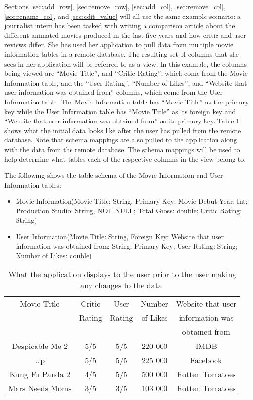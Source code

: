 \documentclass[12pt]{article}
\begin{document}
Sections \ref{sec:add_row}, \ref{sec:remove_row},  \ref{sec:add_col}, \ref{sec:remove_col}, \ref{sec:rename_col}, and \ref{sec:edit_value} will all use the same example scenario: a journalist intern has been tasked with writing a comparison article about the different animated movies produced in the last five years and how critic and user reviews differ. She has used her application to pull data from multiple movie information tables in a remote database. The resulting set of columns that she sees in her application will be referred to as a view. In this example, the columns being viewed are ``Movie Title'', and ``Critic Rating'', which come from the Movie Information table, and the ``User Rating'', ``Number of Likes'', and ``Website that user information was obtained from'' columns, which come from the User Information table. The Movie Information table has ``Movie Title'' as the primary key while the User Information table has ``Movie Title'' as its foreign key and ``Website that user information was obtained from'' as its primary key. Table \ref{table:add_row_table_example} shows what the initial data looks like after the user has pulled from the remote database. Note that schema mappings are also pulled to the application along with the data from the remote database. The schema mappings will be used to help determine what tables each of the respective columns in the view belong to.

The following shows the table schema of the Movie Information and User Information tables:
\begin{itemize}
\item {Movie Information(Movie Title: String, Primary Key; Movie Debut Year: Int; Production Studio: String, NOT NULL; Total Gross: double; Critic Rating: String)}
\item{User Information(Movie Title: String, Foreign Key; Website that user information was obtained from: String, Primary Key; User Rating: String; Number of Likes: double)}
\end{itemize}

\begin{table}[h!]
\centering
\begin{tabular}{ | c | c | c | c | c | }
 \hline
    Movie Title & Critic  & User & Number & Website that user\\
    & Rating & Rating & of Likes & information was \\
    &&&& obtained from\\ \hline \hline
    Despicable Me 2 & 5/5 & 5/5 & 220 000 & IMDB\\ \hline
    Up & 5/5 & 5/5 & 225 000 & Facebook\\ \hline
    Kung Fu Panda 2 & 4/5 & 5/5 & 500 000 & Rotten Tomatoes\\ \hline
    Mars Needs Moms & 3/5 & 3/5 & 103 000 & Rotten Tomatoes\\
    \hline
\end{tabular}
\caption{What the application displays to the user prior to the user making any changes to the data.}
\label{table:add_row_table_example}
\end{table}
\end{document}
